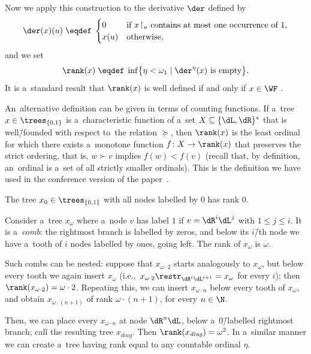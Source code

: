 \documentclass{lmcs}
\numberwithin{equation}{section}
\numberwithin{figure}{section}
\begin{document}
Now we apply this construction to the derivative $\der$ defined by
\[
\der(x)(u) \;\eqdef\;
\begin{cases}
  0	& \text{if $x\!\restriction_u$ contains at most one occurrence of $1$,} \\
  x(u)	& \text{otherwise,}
\end{cases}
\]
and we set
\[
\rank(x) \;\eqdef\; \inf\bigl\{\eta < \omega_1 \mid \der^\eta(x) \text{ is empty}\bigr\}.
\]
\noindent %
It is a~standard result that $\rank(x)$ is well defined if and only if $x \in \WF$ \cite{kechris_descriptive}.

An~alternative definition can be given in terms of counting functions.
If a~tree $x\in\trees_{\{0,1\}}$ is a~characteristic function of a~set $X \subseteq \{\dL,\dR\}^\ast$ that is well\=/founded with respect to~the relation $\succeq$,
then $\rank(x)$ is the least ordinal for which there exists a~monotone function $f\colon X \to \rank(x)$ that preserves the strict ordering, that is, $w \succ v$ implies $f(w) < f(v)$
(recall that, by definition, an~ordinal is a~set of all strictly smaller ordinals).
This is the definition we have used in the conference version of the paper~\cite{dichotomy-stacs}.

\begin{exa} \label{przyklad-grzebien}
	The tree $x_0\in\trees_{\{0,1\}}$ with all nodes labelled by $0$ has rank $0$.

	Consider a~tree $x_\omega$ where a~node $v$ has label $1$ if $v=\dR^i\dL^j$ with $1\leq j\leq i$.
	It is a~\emph{comb}: the rightmost branch is labelled by zeros, and below its $i$\=/th node we have a~tooth of $i$ nodes labelled by ones, going left.
	The rank of $x_\omega$ is $\omega$.

	Such combs can be nested: suppose that $x_{\omega\cdot 2}$ starts analogously to $x_\omega$, but below every tooth we again insert $x_\omega$ (i.e.,~$x_{\omega\cdot 2}\restr_{\dR^i\dL^{i+1}}=x_\omega$ for every $i$);
	then $\rank(x_{\omega\cdot 2})=\omega\cdot 2$.
	Repeating this, we can insert $x_{\omega\cdot n}$ below every tooth of $x_\omega$, and obtain $x_{\omega\cdot(n{+}1)}$ of rank $\omega\cdot(n{+}1)$, for every $n\in\N$.
	
	Then, we can place every $x_{\omega\cdot n}$ at node $\dR^n\dL$, below a~$0$\=/labelled rightmost branch; call the resulting tree $x_{\mathit{diag}}$.
	Then $\rank(x_{\mathit{diag}}) = \omega^2$.
	In a~similar manner we can create a~tree having rank equal to any countable ordinal $\eta$.
\end{exa}
\end{document}
